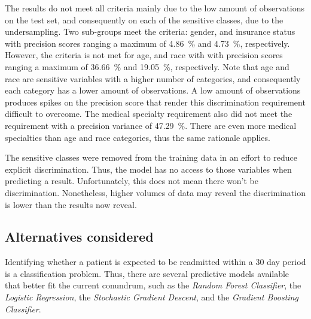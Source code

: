 \documentclass[a4paper,11pt]{article}
\begin{document}
The results do not meet all criteria mainly due to the low amount of observations on the test set, and consequently on each of the sensitive classes, due to the undersampling.  
Two sub-groups meet the criteria: gender, and insurance status with precision scores ranging a maximum of \SI{4.86}{\percent} and \SI{4.73}{\percent}, respectively. However, the criteria is not met for age, and race with with precision scores ranging a maximum of \SI{36.66}{\percent} and \SI{19.05}{\percent}, respectively. Note that age and race are sensitive variables with a higher number of categories, and consequently each category has a lower amount of observations. A low amount of observations produces spikes on the precision score that render this discrimination requirement difficult to overcome.
The medical specialty requirement also did not meet the requirement with a precision variance of \SI{47,29}{\percent}. There are even more medical specialties than age and race categories, thus the same rationale applies.

The sensitive classes were removed from the training data in an effort to reduce explicit discrimination. Thus, the model has no access to those variables when predicting a result. Unfortunately, this does not mean there won't be discrimination. 
Nonetheless, higher volumes of data may reveal the discrimination is lower than the results now reveal.







\subsection{Alternatives considered}
\label{sec:model_alternatives}

Identifying whether a patient is expected to be readmitted within a 30 day period is a classification problem. Thus, there are several predictive models available that better fit the current conundrum, such as the \textit{Random Forest Classifier}, the \textit{Logistic Regression}, the \textit{Stochastic Gradient Descent}, and the \textit{Gradient Boosting Classifier}.
\end{document}
